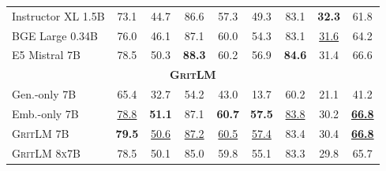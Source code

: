 \documentclass{article}
\newcommand{\model}{\textsc{GritLM}}
\begin{document}
\begin{table}[htbp]
{\begin{tabular}{l|ccccccc|c}
Instructor XL 1.5B & 73.1 & 44.7 & 86.6 & 57.3 & 49.3 & 83.1 & \textbf{32.3} & 61.8 \\
BGE Large 0.34B & 76.0 & 46.1 & 87.1 & 60.0 & 54.3 & 83.1 & \underline{31.6} & 64.2 \\
E5 Mistral 7B & 78.5 & 50.3 & \textbf{88.3} & 60.2 & 56.9 & \textbf{84.6} & 31.4 & 66.6 \\
\midrule
\multicolumn{9}{c}{\textbf{\model{}}} \\
\midrule
Gen.-only 7B & 65.4 & 32.7 & 54.2 & 43.0 & 13.7 & 60.2 & 21.1 & 41.2 \\
Emb.-only 7B & \underline{78.8} & \textbf{51.1} & 87.1 & \textbf{60.7} & \textbf{57.5} & \underline{83.8} & 30.2 & \underline{\textbf{66.8}}\\
\model{} \textsc{7B} & \textbf{79.5} & \underline{50.6} & \underline{87.2} & \underline{60.5} & \underline{57.4} & 83.4 & 30.4 & \underline{\textbf{66.8}} \\
\model{} \textsc{8x7B} & 78.5 & 50.1 & 85.0 & 59.8 & 55.1 & 83.3 & 29.8 & 65.7 \\
\bottomrule
\end{tabular}
}
\label{tab:emb}
\end{table}
\end{document}
